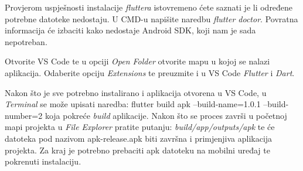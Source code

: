 			Provjerom uspješnosti instalacije \textit{fluttera} istovremeno ćete saznati je li određene potrebne datoteke nedostaju. U CMD-u napišite naredbu \textit{flutter doctor}. Povratna informacija će izbaciti kako nedostaje Android SDK, koji nam je sada nepotreban.
			
			Otvorite VS Code te u opciji \textit{Open Folder} otvorite mapu u kojoj se nalazi aplikacija. Odaberite opciju \textit{Extensions} te preuzmite i u VS Code \textit{Flutter} i \textit{Dart}.
			
			Nakon što je sve potrebno instalirano i aplikacija otvorena u VS Code, u \textit{Terminal} se može upisati naredba: flutter build apk --build-name=1.0.1 --build-number=2 koja pokreće \textit{build} aplikacije. Nakon što se proces završi u početnoj mapi projekta u \textit{File Explorer} pratite putanju: \textit{build/app/outputs/apk} te će datoteka pod nazivom apk-release.apk biti završna i primjenjiva aplikacija projekta. Za kraj je potrebno prebaciti apk datoteku na mobilni uređaj te pokrenuti instalaciju.
			
			
			\eject 